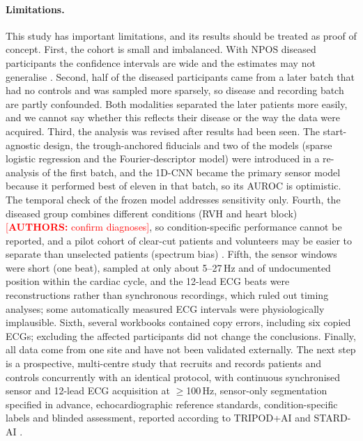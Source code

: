 \documentclass[11pt]{article}
\newcommand{\authnote}[1]{\textcolor{red}{[\textbf{AUTHORS:} #1]}}
\begin{document}
\paragraph{Limitations.} This study has important limitations, and its results should be treated as proof of concept. First, the cohort is small and imbalanced. With {{NPOS}} diseased participants the confidence intervals are wide and the estimates may not generalise \cite{varoquaux2018cross,vabalas2019machine,riley2020calculating}. Second, half of the diseased participants came from a later batch that had no controls and was sampled more sparsely, so disease and recording batch are partly confounded. Both modalities separated the later patients more easily, and we cannot say whether this reflects their disease or the way the data were acquired. Third, the analysis was revised after results had been seen. The start-agnostic design, the trough-anchored fiducials and two of the models (sparse logistic regression and the Fourier-descriptor model) were introduced in a re-analysis of the first batch, and the 1D-CNN became the primary sensor model because it performed best of eleven in that batch, so its AUROC is optimistic. The temporal check of the frozen model addresses sensitivity only. Fourth, the diseased group combines different conditions (RVH and heart block) \authnote{confirm diagnoses}, so condition-specific performance cannot be reported, and a pilot cohort of clear-cut patients and volunteers may be easier to separate than unselected patients (spectrum bias) \cite{wolff2019probast,bossuyt2015stard}. Fifth, the sensor windows were short (one beat), sampled at only about 5--27\,Hz and of undocumented position within the cardiac cycle, and the 12-lead ECG beats were reconstructions rather than synchronous recordings, which ruled out timing analyses; some automatically measured ECG intervals were physiologically implausible. Sixth, several workbooks contained copy errors, including six copied ECGs; excluding the affected participants did not change the conclusions. Finally, all data come from one site and have not been validated externally. The next step is a prospective, multi-centre study that recruits and records patients and controls concurrently with an identical protocol, with continuous synchronised sensor and 12-lead ECG acquisition at $\geq$100\,Hz, sensor-only segmentation specified in advance, echocardiographic reference standards, condition-specific labels and blinded assessment, reported according to TRIPOD+AI and STARD-AI \cite{collins2024tripod,sounderajah2025stard,bossuyt2015stard,wolff2019probast,kelly2019key,liu2020reporting}.
\end{document}
